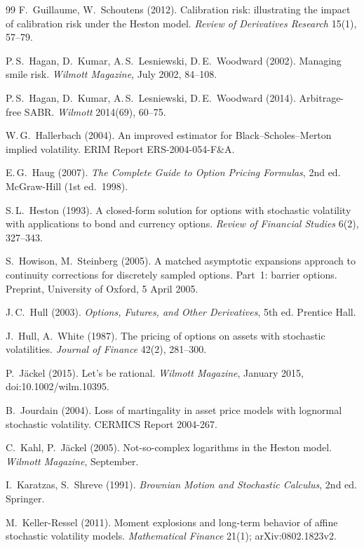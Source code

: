 \begin{thebibliography}{99}
F.~Guillaume, W.~Schoutens (2012).
Calibration risk: illustrating the impact of calibration risk under the Heston model.
\emph{Review of Derivatives Research} 15(1), 57--79.

P.\,S.~Hagan, D.~Kumar, A.\,S.~Lesniewski, D.\,E.~Woodward (2002).
Managing smile risk.
\emph{Wilmott Magazine}, July 2002, 84--108.

P.\,S.~Hagan, D.~Kumar, A.\,S.~Lesniewski, D.\,E.~Woodward (2014).
Arbitrage-free SABR.
\emph{Wilmott} 2014(69), 60--75.

W.\,G.~Hallerbach (2004).
An improved estimator for Black--Scholes--Merton implied volatility.
ERIM Report ERS-2004-054-F\&A.

E.\,G.~Haug (2007).
\emph{The Complete Guide to Option Pricing Formulas}, 2nd ed.
McGraw-Hill (1st ed.\ 1998).

S.\,L.~Heston (1993).
A closed-form solution for options with stochastic volatility with applications to bond and currency options.
\emph{Review of Financial Studies} 6(2), 327--343.

S.~Howison, M.~Steinberg (2005).
A matched asymptotic expansions approach to continuity corrections for discretely sampled options. Part~1: barrier
options.
Preprint, University of Oxford, 5 April 2005.

J.\,C.~Hull (2003).
\emph{Options, Futures, and Other Derivatives}, 5th ed.
Prentice Hall.

J.~Hull, A.~White (1987).
The pricing of options on assets with stochastic volatilities.
\emph{Journal of Finance} 42(2), 281--300.

P.~Jäckel (2015).
Let's be rational.
\emph{Wilmott Magazine}, January 2015, doi:10.1002/wilm.10395.

B.~Jourdain (2004).
Loss of martingality in asset price models with lognormal stochastic volatility.
CERMICS Report 2004-267.

C.~Kahl, P.~Jäckel (2005).
Not-so-complex logarithms in the Heston model.
\emph{Wilmott Magazine}, September.

I.~Karatzas, S.~Shreve (1991).
\emph{Brownian Motion and Stochastic Calculus}, 2nd ed.
Springer.

M.~Keller-Ressel (2011).
Moment explosions and long-term behavior of affine stochastic volatility models.
\emph{Mathematical Finance} 21(1); arXiv:0802.1823v2.


\end{thebibliography}
